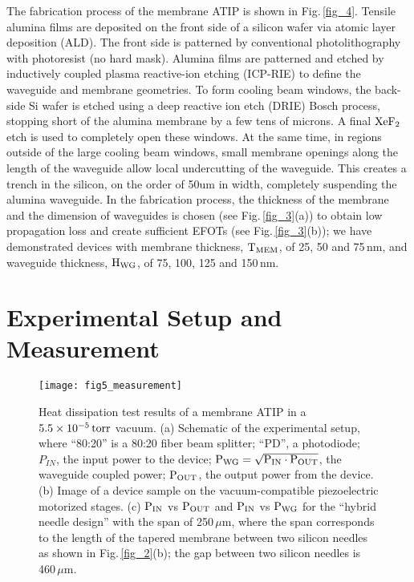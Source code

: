 \documentclass{osa-article}
\begin{document}
The fabrication process of the membrane ATIP is shown in Fig.\,\ref{fig_4}. Tensile alumina films are deposited on the front side of a silicon wafer via atomic layer deposition (ALD). The front side is patterned by conventional photolithography with photoresist (no hard mask). Alumina films are patterned and etched by inductively coupled plasma reactive-ion etching (ICP-RIE) to define the waveguide and membrane geometries. To form cooling beam windows, the back-side Si wafer is etched using a deep reactive ion etch (DRIE) Bosch process, stopping short of the alumina membrane by a few tens of microns. A final $\rm{XeF_2}$ etch is used to completely open these windows.  At the same time, in regions outside of the large cooling beam windows, small membrane openings along the length of the waveguide allow local undercutting of the waveguide.  This creates a trench in the silicon, on the order of 50um in width, completely suspending the alumina waveguide. In the  fabrication process, the thickness of the membrane and the dimension of waveguides is chosen (see Fig.\,\ref{fig_3}(a)) to obtain low propagation loss and create sufficient EFOTs (see Fig.\,\ref{fig_3}(b)); we have demonstrated devices with membrane thickness, $\rm{T_{MEM}}$, of 25, 50 and 75\,nm, and waveguide thickness, $\rm{H_{WG}}$, of 75, 100, 125 and 150\,nm.  
 
\section{Experimental Setup and Measurement}

\begin{figure}[b!]
\centering\texttt{[image: fig5\_measurement]}
\caption{Heat dissipation test results of a membrane ATIP in a $5.5 \times 10^{-5} \,\rm{torr}$ vacuum. (a) Schematic of the experimental setup, where ``80:20'' is a 80:20 fiber beam splitter; ``PD'', a photodiode; $P_{IN}$, the input power to the device; $\rm{P_{WG} = \sqrt{P_{IN} \cdot P_{OUT}}}$, the waveguide coupled power; $\rm{P_{OUT}}$, the output power from the device. (b) Image of a device sample on the vacuum-compatible piezoelectric motorized stages. (c) $\rm{P_{IN}}$ vs $\rm{P_{OUT}}$ and $\rm{P_{IN}}$ vs $\rm{P_{WG}}$ for the ``hybrid needle design'' with the span of 250\,$\mu$m, where the span corresponds to the length of the tapered membrane between two silicon needles as shown in Fig.\,\ref{fig_2}(b); the gap between two silicon needles is 460\,$\mu$m.}
\label{fig_5}
\end{figure}
\end{document}
